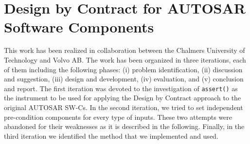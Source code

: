 \section{Design by Contract for AUTOSAR Software Components}\label{sec:approach}

%
%

This work has been realized in collaboration between the Chalmers University of Technology and Volvo AB. The work has been organized in three iterations, each of them including the following phases: (i) problem identification, (ii) discussion and suggestion, (iii) design and development, (iv) evaluation, and (v) conclusion and report. 
The first iteration was devoted to the investigation of \texttt{assert()} %
as the instrument to be used for applying the Design by Contract approach to the original AUTOSAR SW-Cs. In the second iteration, we tried to set independent pre-condition components for every type of inputs. These two attempts were abandoned for their weaknesses as it is described in the following. Finally, in the third iteration we identified the method that we implemented and used. %

